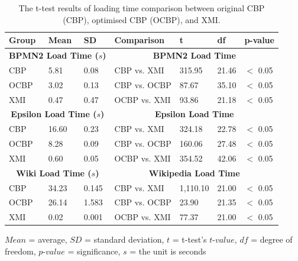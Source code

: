 {\begin{table}[ht]
\footnotesize
\centering
\caption{The t-test results of loading time comparison between original CBP (CBP), optimised CBP (OCBP), and XMI.}
\label{table:ttest_results_loadtime}
\begin{tabular}
{|p{}p{}p{}|p{}p{}p{}p{}|}
\hline 
Group & Mean & SD & Comparison & t  & df & p-value \\  
\hline 
\multicolumn{3}{|c|}{\textbf{BPMN2 Load Time ($s$)}} & \multicolumn{4}{c|}{\textbf{BPMN2 Load Time}} \\ 
CBP & 5.81 & 0.08 & CBP vs. XMI & 315.95    &21.46 & $<$ 0.05 \\  
OCBP & 3.02 & 0.13 & CBP vs. OCBP & 87.67 & 35.10  & $<$ 0.05 \\  
XMI & 0.47 & 0.47 & OCBP vs. XMI & 93.86    & 21.18  & $<$ 0.05 \\ 
\hline 

\multicolumn{3}{|c|}{\textbf{Epsilon Load Time ($s$)}} & \multicolumn{4}{c|}{\textbf{Epsilon Load Time}} \\
CBP & 16.60    & 0.23 &  CBP vs. XMI & 324.18   &22.78 & $<$ 0.05 \\
OCBP &  8.28  &  0.09 & CBP vs. OCBP & 160.06 & 27.48 & $<$ 0.05 \\  
XMI & 0.60   & 0.05 & OCBP vs. XMI & 354.52   &42.06  & $<$ 0.05 \\ 
\hline 

\multicolumn{3}{|c|}{\textbf{Wiki Load Time ($s$)}} & \multicolumn{4}{c|}{\textbf{Wikipedia Load Time}} \\
CBP & 34.23   & 0.145 & CBP vs. XMI & 1,110.10   &21.00 & $<$ 0.05 \\ 
OCBP & 26.14  & 1.583 & CBP vs. OCBP &  23.90 &21.35 & $<$ 0.05 \\ 
XMI &  0.02  & 0.001 & OCBP vs. XMI & 77.37   & 21.00 & $<$ 0.05 \\ 
\hline
\end{tabular}
\justify
$Mean$ = average, $SD$ = standard deviation, $t$ = t-test's $t$-$value$, $df$ = degree of freedom, $p$-$value$ = significance, $s$ = the unit is seconds
\end{table}

}
